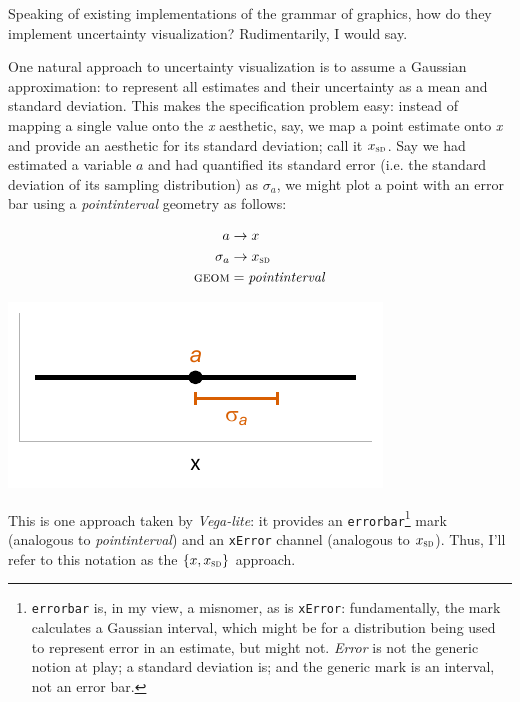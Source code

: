 \documentclass[journal]{vgtc}                     %
\begin{document}
Speaking of existing implementations of the grammar of graphics, how do they implement uncertainty visualization? Rudimentarily, I would say.

One natural approach to uncertainty visualization is to assume a Gaussian approximation: to represent all estimates and their uncertainty as a mean and standard deviation. This makes the specification problem easy: instead of mapping a single value onto the \textit{x} aesthetic, say, we map a point estimate onto \textit{x} and provide an aesthetic for its standard deviation; call it $x_\textsc{sd}$. Say we had estimated a variable $a$ and had quantified its standard error (i.e. the standard deviation of its sampling distribution) as $\sigma_a$, we might plot a point with an error bar using a \textit{pointinterval} geometry as follows:

\hfill\break
  \begin{minipage}{.5\columnwidth}
\begin{align*}
a &\rightarrow x\\
\sigma_a &\rightarrow x_\textsc{sd}\\
\textsc{geom} &= \mathit{pointinterval}
\end{align*}
  \end{minipage}%
  \begin{minipage}{.4\columnwidth}
    \centering
    \includegraphics[width=1.2\columnwidth]{figs/2-mean_sd_interval.pdf}
  \end{minipage}

This is one approach taken by \textit{Vega-lite}: it provides an \texttt{errorbar}\footnote{\texttt{errorbar} is, in my view, a misnomer, as is \texttt{xError}: fundamentally, the mark calculates a Gaussian interval, which might be for a distribution being used to represent error in an estimate, but might not. \textit{Error} is not the generic notion at play; a standard deviation is; and the generic mark is an interval, not an error bar.} mark (analogous to \textit{pointinterval}) and an \texttt{xError}  channel (analogous to $x_\textsc{sd}$). Thus, I'll refer to this notation as the $\{x, x_\textsc{sd}\}$ approach.
\end{document}
